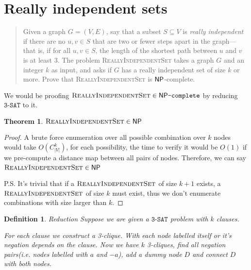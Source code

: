 
\newtheorem{theorem}{Theorem}
\newtheorem{lemma}[theorem]{Lemma}
\newtheorem{definition}{Definition}[section]


\maketitle
\thispagestyle{firststyle}
\vspace{-2.0cm}

\newcommand{\RIS}{\textsc{ReallyIndependentSet}}
\newcommand{\NPC}{\mathsf{NP}\texttt{-complete}}
\newcommand{\tSAT}{\texttt{3-SAT}}

\section{Really independent sets}
    \begin{quote}
    Given a graph $G = (V,E)$, say that a subset $S \subseteq V$ is \emph{really independent} if there are no $u,v \in S$ that are two or fewer steps apart in the graph---that is, if for all $u,v \in S$, the length of the shortest path
    between $u$ and $v$ is at least 3.
    The problem \textsc{ReallyIndependentSet} takes a graph $G$ and an integer $k$ as input, and asks if $G$ has a really independent set of size $k$ or more.
    Prove that \textsc{ReallyIndependentSet} is $\mathsf{NP}$-complete.
    \end{quote}

We would be proofing $\RIS \in \NPC$ by reducing $\tSAT$ to it. 

\begin{theorem}
    $\RIS \in \NP $
\end{theorem}

\begin{proof}
    A brute force enumeration over all possible combination over $k$ nodes would take $O(C^k_{|V|})$, for each possibility, the time to verify it would be $O(1)$ if we pre-compute a distance map between all pairs of nodes.
    Therefore, we can say $\RIS \in \NP$
    
    P.S. It's trivial that if a $\RIS$ of size $k+1$ exists, a $\RIS$ of size $k$ must exist, thus we don't enumerate combinations with size larger than $k$.
\end{proof}

\begin{definition}{Reduction}
    Suppose we are given a $\tSAT$ problem with $k$ clauses.

    For each clause we construct a 3-clique. With each node labelled itself or it's negation depends on the clause.
    Now we have $k$ 3-cliques, find all negation pairs(i.e. nodes labelled with $a$ and $-a$), add a dummy node $D$ and connect $D$ with both nodes.
\end{definition}

